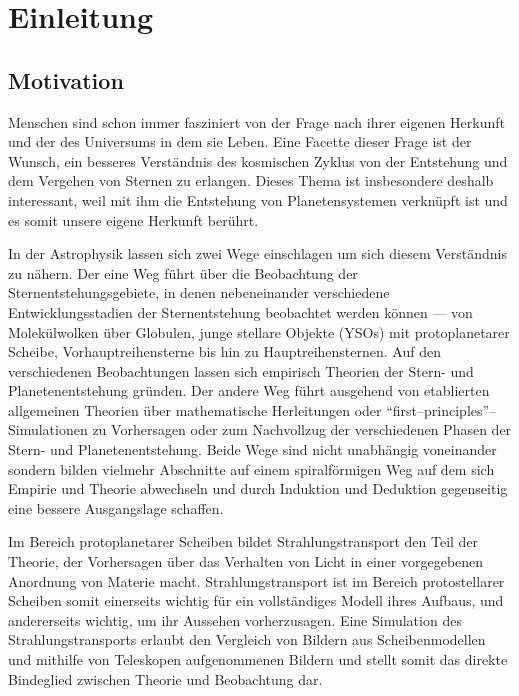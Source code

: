 	\chapter{Einleitung}
	\section{Motivation}
	Menschen sind schon immer fasziniert von der Frage nach ihrer eigenen Herkunft und der des Universums in dem sie Leben. Eine Facette dieser Frage ist der Wunsch, ein besseres Verständnis des kosmischen Zyklus von der Entstehung und dem Vergehen von Sternen zu erlangen. Dieses Thema ist insbesondere deshalb interessant, weil mit ihm die Entstehung von Planetensystemen verknüpft ist und es somit unsere eigene Herkunft berührt.
	
	In der Astrophysik lassen sich zwei Wege einschlagen um sich diesem Ver\-ständ\-nis zu nähern. Der eine Weg führt über die Beobachtung der Sternentstehungsgebiete, in denen nebeneinander verschiedene Entwicklungsstadien der Sternentstehung beobachtet werden können --- von Molekülwolken über Globulen, junge stellare Objekte (YSOs) mit protoplanetarer Scheibe, Vorhauptreihensterne bis hin zu Hauptreihensternen.
	Auf den verschiedenen Beobachtungen lassen sich empirisch Theorien der Stern- und Planetenentstehung gründen. Der andere Weg führt ausgehend von etablierten allgemeinen Theorien über mathematische Herleitungen oder ``first--principles''--Simulationen zu Vorhersagen oder zum Nachvollzug der verschiedenen Phasen der Stern- und Planetenentstehung. Beide Wege sind nicht unabhängig voneinander sondern bilden vielmehr Abschnitte auf einem spiralförmigen Weg auf dem sich Empirie und Theorie abwechseln und durch Induktion und Deduktion gegenseitig eine bessere Ausgangslage schaffen.
	
	Im Bereich protoplanetarer Scheiben bildet Strahlungstransport den Teil der Theorie, der Vorhersagen über das Verhalten von Licht in einer vorgegebenen Anordnung von Materie macht. Strahlungstransport ist im Bereich protostellarer Scheiben somit einerseits wichtig für ein vollständiges Modell ihres Aufbaus, und andererseits wichtig, um ihr Aussehen vorherzusagen. Eine Simulation des Strahlungstransports erlaubt den Vergleich von Bildern aus Scheibenmodellen und mithilfe von Teleskopen aufgenommenen Bildern und stellt somit das direkte Bindeglied zwischen Theorie und Beobachtung dar.
	
